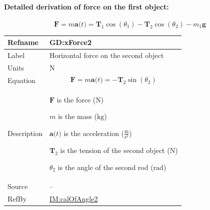 \documentclass[12pt]{article}
\begin{document}
\paragraph{Detailed derivation of force on the first object:}
\label{GD:yForce1Deriv}
\begin{displaymath}
\symbf{F}=m \symbf{a}\text{(}t\text{)}={\symbf{T}_{1}} \cos\left({θ_{1}}\right)-{\symbf{T}_{2}} \cos\left({θ_{2}}\right)-{m_{1}} \symbf{g}
\end{displaymath}
\vspace{\baselineskip}
\noindent
\begin{minipage}{\textwidth}
\begin{tabular}{>{\raggedright}p{}>{\raggedright\arraybackslash}p{}}
\toprule \textbf{Refname} & \textbf{GD:xForce2}
\label{GD:xForce2}
\\ \midrule
Label & Horizontal force on the second object
        
\\ \midrule
Units & ${\text{N}}$
        
\\ \midrule
Equation & \begin{displaymath}
           \symbf{F}=m \symbf{a}\text{(}t\text{)}=-{\symbf{T}_{2}} \sin\left({θ_{2}}\right)
           \end{displaymath}
\\ \midrule
Description & \begin{symbDescription}
              \item{$\symbf{F}$ is the force (${\text{N}}$)}
              \item{$m$ is the mass (${\text{kg}}$)}
              \item{$\symbf{a}\text{(}t\text{)}$ is the acceleration ($\frac{\text{m}}{\text{s}^{2}}$)}
              \item{${\symbf{T}_{2}}$ is the tension of the second object (${\text{N}}$)}
              \item{${θ_{2}}$ is the angle of the second rod (${\text{rad}}$)}
              \end{symbDescription}
\\ \midrule
Source & --
         
\\ \midrule
RefBy & \hyperref[IM:calOfAngle2]{IM:calOfAngle2}
        
\\ \bottomrule
\end{tabular}
\end{minipage}
\end{document}
